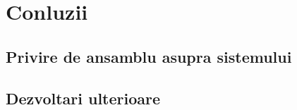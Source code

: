 
 \chapter{Conluzii}
\label{cap:concluzii}
\section{Privire de ansamblu asupra sistemului}

\section{Dezvoltari ulterioare}
%
% 
% 
%
%






